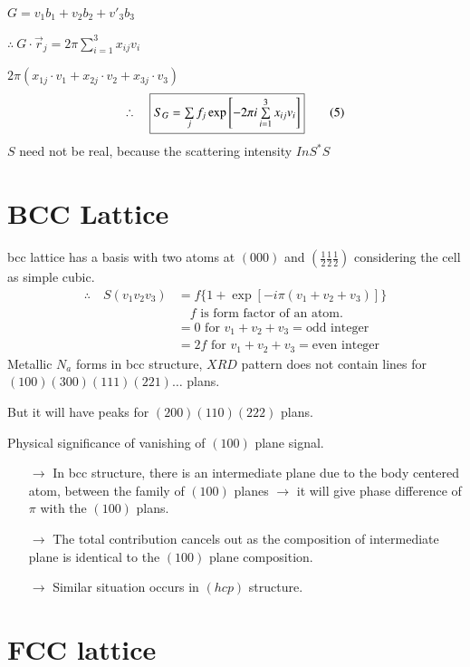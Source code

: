 $G=v_{1}b_{1}+v_{2}b_{2}+v'_{3}b_{3}$

$\therefore \ G\cdot \overrightarrow{r}_{j}=2\pi \sum\limits^{3}_{i=1}x_{ij}v_{i}$

$2\pi (x_{1j}\cdot v_{1}+x_{2j}\cdot v_{2}+x_{3j}\cdot v_{3})$
\begin{equation*}
\therefore\quad \fbox{$S_{G}=\sum\limits_{j}f_{j}\exp \left[-2\pi i \sum\limits^{3}_{i=1}x_{ij}v_{i}\right]$}\tag{5}\label{lec14-eq5}
\end{equation*}
$S$ need not be real, because the scattering intensity $InS^{*}S$

\section*{BCC Lattice}

bcc lattice has a basis with two atoms at $(000)$ and $(\frac{1}{2}\frac{1}{2}\frac{1}{2})$ considering the cell as simple cubic.
\begin{align*}
\therefore\quad S(v_{1}v_{2}v_{3}) &= f\{1+\exp[-i\pi(v_{1}+v_{2}+v_{3})]\}\\
&\quad f \text{ is form factor of an atom.}\\
&= 0\text{ for } v_{1}+v_{2}+v_{3}=\text{odd integer}\\
&= 2f \text{ for } v_{1}+v_{2}+v_{3}=\text{even integer}
\end{align*}
Metallic $N_{a}$ forms in bcc structure, $XRD$ pattern does not contain lines for $(100)(300)(111)(221)\ldots$ plans.

But it will have peaks for $(200)(110)(222)$ plans.

Physical significance of vanishing of $(100)$ plane signal.
\begin{itemize}
\item[$\to$] In bcc structure, there is an intermediate plane due to the body centered atom, between the family of $(100)$ planes $\to$ it will give phase difference of $\pi$ with the $(100)$ plans.

\item[$\to$] The total contribution cancels out as the composition of intermediate plane is identical to the $(100)$ plane composition.

\item[$\to$] Similar situation occurs in $(hcp)$ structure.
\end{itemize}

\section*{FCC lattice}

